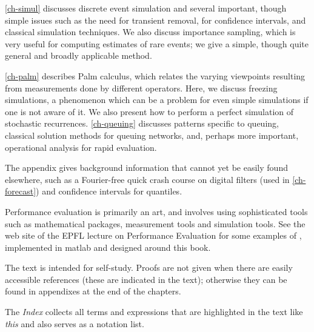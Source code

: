 \cref{ch-simul} discusses discrete event simulation and several
important, though simple issues such as the need for transient
removal, for confidence intervals, and classical simulation
techniques. We also discuss importance sampling, which is very
useful for computing estimates of rare events; we give a
simple, though quite general and broadly applicable method.

\cref{ch-palm} describes Palm calculus, which relates the
varying viewpoints resulting from measurements done by
different operators. Here, we discuss freezing simulations, a
phenomenon which can be a problem for even simple simulations
if one is not aware of it. We also present how to perform a
perfect simulation of stochastic recurrences. \cref{ch-queuing}
discusses patterns specific to queuing, classical solution
methods for queuing networks, and, perhaps more important,
operational analysis for rapid evaluation.

%

The appendix gives background information that cannot yet be easily
found elsewhere, such as a Fourier-free quick crash
course on digital filters (used in \cref{ch-forecast}) and
confidence intervals for quantiles.
%

Performance evaluation is primarily an art, and
involves using sophisticated tools such as
mathematical packages, measurement tools and
simulation tools. See the web site of the EPFL
lecture on Performance Evaluation for some
examples of , implemented in
matlab and designed around this book.

The text is intended for self-study. Proofs are not given when
there are easily accessible references (these are indicated in
the text); otherwise they can be found in appendixes at the end of the chapters.

%
%

The \emph{Index} collects all terms and
expressions that are highlighted in the text like
{\it \blue \textsf{this}} and also serves as a
notation list.
